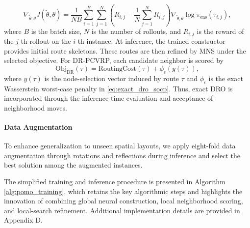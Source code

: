\documentclass[preprint,12pt,authoryear]{elsarticle}
\theoremstyle{definition}
\begin{document}
\begin{equation}
\nabla_{\tilde{\theta}, \theta} J(\tilde{\theta}, \theta) = \frac{1}{NB} \sum_{i=1}^{B} \sum_{j=1}^{N} \left(R_{i,j} - \frac{1}{N} \sum_{j=1}^{N} R_{i,j}\right) \nabla_{\tilde{\theta}, \theta} \log \pi_{\text{ens}}(\tau_{i,j}),
\end{equation}
\noindent where $B$ is the batch size, $N$ is the number of rollouts, and $R_{i,j}$ is the reward of the $j$-th rollout on the $i$-th instance. At inference, the trained constructor provides initial route skeletons. These routes are then refined by MNS under the selected objective. For DR-PCVRP, each candidate neighbor is scored by
\begin{equation}
\text{Obj}_{\mathrm{DR}}(\tau)=\text{RoutingCost}(\tau)+\phi_{\epsilon}(y(\tau)),
\end{equation}
where $y(\tau)$ is the node-selection vector induced by route $\tau$ and $\phi_{\epsilon}$ is the exact Wasserstein worst-case penalty in \eqref{eq:exact_dro_socp}. Thus, exact DRO is incorporated through the inference-time evaluation and acceptance of neighborhood moves.

\paragraph{Data Augmentation}
To enhance generalization to unseen spatial layouts, we apply eight-fold data augmentation through rotations and reflections during inference and select the best solution among the augmented instances.

The simplified training and inference procedure is presented in Algorithm \ref{alg:pomo_training}, which retains the key algorithmic steps and highlights the innovation of combining global neural construction, local neighborhood scoring, and local-search refinement. Additional implementation details are provided in Appendix D.
\end{document}
